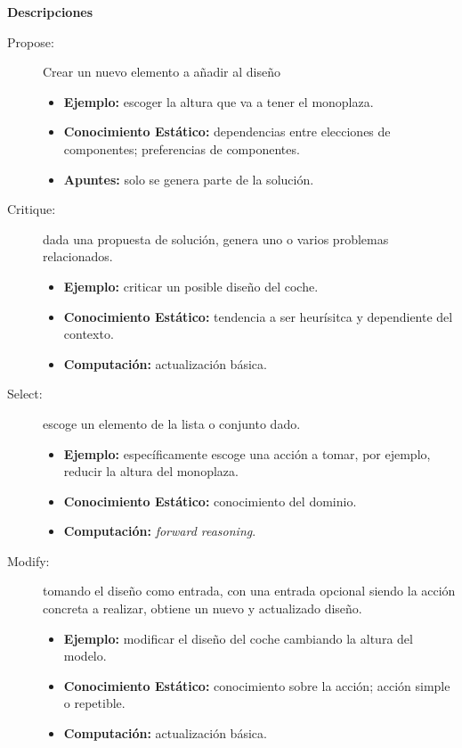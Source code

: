 \documentclass[12pt,a4paper,twoside,spanish]{article}      %
\begin{document}
\textbf{Descripciones}
\begin{description}
    \item [Propose:] Crear un nuevo elemento a añadir al diseño
        \hspace*{2cm}
        \begin{itemize}
            \item \textbf {Ejemplo:} escoger la altura que va a tener el monoplaza.
            \item \textbf {Conocimiento Estático:} dependencias entre elecciones de componentes; preferencias de componentes.
            \item \textbf {Apuntes:} solo se genera parte de la solución.
        \end{itemize}
    \item [Critique:] dada una propuesta de solución, genera uno o varios problemas relacionados.
       \begin{itemize}
            \item \textbf {Ejemplo:} criticar un posible diseño del coche.
            \item \textbf {Conocimiento Estático:} tendencia a ser heurísitca y dependiente del contexto.
            \item \textbf {Computación:} actualización básica.
        \end{itemize}
    \item [Select:] escoge un elemento de la lista o conjunto dado.
        \begin{itemize}
            \item \textbf {Ejemplo:} específicamente escoge una acción a tomar, por ejemplo, reducir la altura del monoplaza.
            \item \textbf {Conocimiento Estático:} conocimiento del dominio.
            \item \textbf {Computación:} \emph{forward reasoning}.
        \end{itemize}
    \item [Modify:] tomando el diseño como entrada, con una entrada opcional siendo la acción concreta a realizar, obtiene un nuevo y actualizado diseño.
        \begin{itemize}
            \item \textbf {Ejemplo:} modificar el diseño del coche cambiando la altura del modelo.
            \item \textbf {Conocimiento Estático:} conocimiento sobre la acción; acción simple o repetible.
            \item \textbf {Computación:} actualización básica.

\end{itemize}
\end{description}
\end{document}
